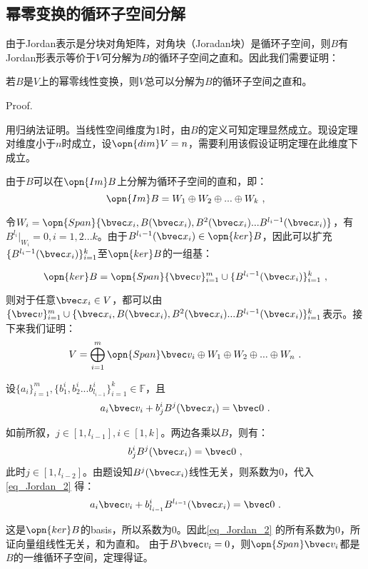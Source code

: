 \subsection{幂零变换的循环子空间分解}

由于Jordan表示是分块对角矩阵，对角块（Joradan块）是循环子空间，则$B$有Jordan形表示等价于$V$可分解为$B$的循环子空间之直和。因此我们需要证明：

\begin{theorem}{}
若$B$是$V$上的幂零线性变换，则$V$总可以分解为$B$的循环子空间之直和。
\end{theorem}
Proof.

用归纳法证明。当线性空间维度为1时，由$B$的定义可知定理显然成立。现设定理对维度小于$n$时成立，设$\opn{dim}V=n$，需要利用该假设证明定理在此维度下成立。

由于$B$可以在$\opn{Im}B$上分解为循环子空间的直和，即：
\begin{equation}
\opn{Im}B=W_1\oplus W_2\oplus...\oplus W_k~,
\end{equation}

令$W_i=\opn{Span}\{\bvec x_i,B(\bvec x_i),B^2(\bvec x_i)...B^{l_i-1}(\bvec x_i)\}$，有$B^{l_i}|_{W_i}=0,i=1,2...k$。由于$B^{l_i-1}(\bvec x_i)\in \opn{ker}B$，因此可以扩充$\{B^{l_i-1}(\bvec x_i)\}^k_{i=1}$至$\opn{ker}B$的一组基：

\begin{equation}
\opn{ker}B=\opn{Span}\{\bvec v\}^m_{i=1}\cup \{B^{l_i-1}(\bvec x_i)\}^k_{i=1}~,
\end{equation}

则对于任意$\bvec x_i\in V$，都可以由$\{\bvec v\}^m_{i=1}\cup \{\bvec x_i,B(\bvec x_i),B^2(\bvec x_i)...B^{l_i-1}(\bvec x_i)\}^{k}_{i=1}$表示。接下来我们证明：
\begin{equation}
V=\bigoplus ^m_{i=1}\opn{Span}\bvec v_i\oplus W_1\oplus W_2\oplus...\oplus W_n~.
\end{equation}


设$\{a_i\}^m_{i=1},\{b^i_1,b^i_2...b^i_{l_{i-1}}\}^{k}_{i=1}\in\mathbb F$，且
\begin{equation}\label{eq_Jordan_2}
a_i\bvec v_i+b^i_jB^{j}(\bvec x_i)=\bvec 0~.
\end{equation}

如前所叙，$j\in[1,l_{i-1}],i\in[1,k]$。两边各乘以$B$，则有：
\begin{equation}
b^i_jB^{j}(\bvec x_i)=\bvec 0~,
\end{equation}
此时$j\in[1,l_{i-2}]$。由题设知$B^j(\bvec x_i)$线性无关，则系数为$0$，代入\autoref{eq_Jordan_2} 得：
\begin{equation}
a_i\bvec v_i+b^i_{l_{i-1}}B^{l_{i-1}}(\bvec x_i)=\bvec 0~.
\end{equation}

这是$\opn{ker}B$的basis，所以系数为$0$。因此\autoref{eq_Jordan_2} 的所有系数为0，所证向量组线性无关，和为直和。
由于$B\bvec v_i=0$，则$\opn{Span}\bvec v_i$都是$B$的一维循环子空间，定理得证。


